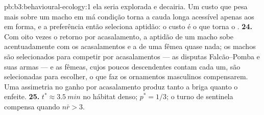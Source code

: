 \begin{solution}{pb:b3:behavioural-ecology:1}
ela seria explorada e decairia. Um custo que pesa mais sobre um macho em
má condição torna a cauda longa acessível apenas aos em forma, e a
preferência então seleciona aptidão: o custo é o que torna o .
\textbf{24.} Com oito vezes o retorno por acasalamento, a aptidão de um
macho sobe acentuadamente com os acasalamentos e a de uma fêmea quase
nada; os machos são selecionados para competir por acasalamentos --- as
disputas Falcão--Pomba e suas armas --- e as fêmeas, cujos poucos
descendentes contam cada um, são selecionadas para escolher, o que faz os
ornamentos masculinos compensarem. Uma assimetria no ganho por
acasalamento produz tanto a briga quanto o enfeite.
\textbf{25.} $t^{*} \approx \qty{3.5}{min}$ no hábitat denso; $p^{*}
= 1/3$; o turno de sentinela compensa quando $n\bar r > 3$.
\end{solution}
